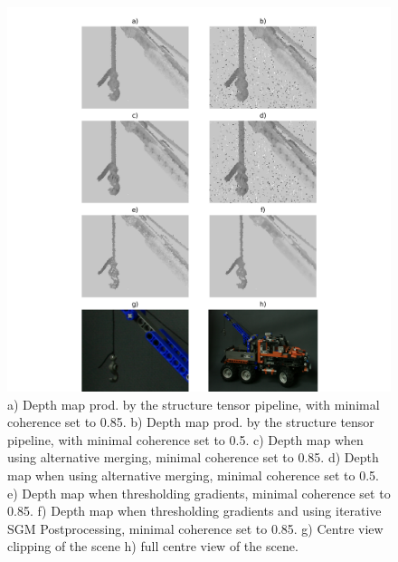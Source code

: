 \documentclass  [
  paper    = a4,
  BCOR     = 10mm,
  twoside,
  fontsize = 12pt,
  fleqn,
  toc      = bibnumbered,
  toc      = listofnumbered,
  numbers  = noendperiod,
  headings = normal,
  listof   = leveldown,
  version  = 3.03
]                                       {scrreprt}
\begin{document}
\begin{figure}
	\centering
	\includegraphics[width=1\linewidth]{images/truck_realdata_small}
	\caption[Truck clipping with iterative SGM]{a) Depth map prod. by the structure tensor pipeline, with minimal coherence set to 0.85. b) Depth map prod. by the structure tensor pipeline, with minimal coherence set to 0.5. c) Depth map when using alternative merging, minimal coherence set to 0.85. d) Depth map when using alternative merging, minimal coherence set to 0.5. e) Depth map when thresholding gradients, minimal coherence set to 0.85. f) Depth map when thresholding gradients and using iterative SGM Postprocessing, minimal coherence set to 0.85.  g) Centre view clipping of the scene h) full centre view of the scene.}
	\label{fig:truckrealdatasmall}
\end{figure}
\end{document}
